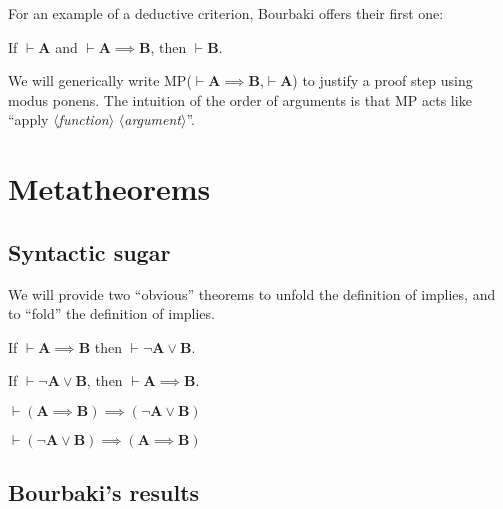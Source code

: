 \documentclass{amsart}%
\newcommand\metavariable[1]{\boldsymbol{#1}}
\begin{document}
For an example of a deductive criterion, Bourbaki offers their first one:

\begin{dc}[Syllogism]
If $\vdash\metavariable{A}$ and $\vdash\metavariable{A}\implies\metavariable{B}$,
then $\vdash\metavariable{B}$.
\end{dc}

We will generically write MP($\vdash\metavariable{A}\implies\metavariable{B}$,$\vdash\metavariable{A}$)
to justify a proof step using modus ponens. The intuition of the order
of arguments is that MP acts like ``apply $\langle$\textit{function}$\rangle$
$\langle$\textit{argument}$\rangle$''.

\setcounter{dc}{5}

\section{Metatheorems}

\subsection{Syntactic sugar} We will provide two ``obvious'' theorems to
unfold the definition of implies, and to ``fold'' the definition of implies.

\begin{syn}\label{unfold-implies}
If $\vdash\metavariable{A}\implies\metavariable{B}$
then $\vdash\neg\metavariable{A}\lor\metavariable{B}$.
\end{syn}

\begin{syn}\label{fold-implies}
If $\vdash\neg\metavariable{A}\lor\metavariable{B}$,
then $\vdash\metavariable{A}\implies\metavariable{B}$.
\end{syn}

\begin{syn}\label{syn:tautology:implies-to-lor}
$\vdash(\metavariable{A}\implies\metavariable{B})\implies(\neg\metavariable{A}\lor\metavariable{B})$
\end{syn}

\begin{syn}\label{syn:tautology:lor-to-implies}
$\vdash(\neg\metavariable{A}\lor\metavariable{B})\implies(\metavariable{A}\implies\metavariable{B})$
\end{syn}

\subsection{Bourbaki's results}
\end{document}
